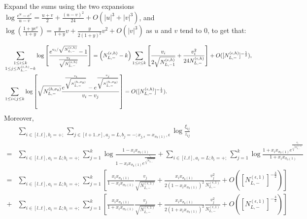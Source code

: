 \documentclass[11pt]{amsart}
\theoremstyle{plain}
\theoremstyle{definition}
\theoremstyle{remark}
\newcommand\si{\sigma}
\numberwithin{equation}{section}
\numberwithin{theorem}{section}
\numberwithin{figure}{section}
\begin{document}
Expand the sums using the  two expansions
$\log\frac{e^u-e^v}{u-v}=\frac{u+v}{2}+\frac{(u-v)^2}{24}+O(|u|^3+|v|^3)$, and
$\log(\frac{1+ye^v}{1+y})=\frac{y}{1+y}v+\frac{y}{2(1+y)^2}v^2+O(|v|^3)$ as $u$ and $v$
tend to 0, to get that:
\begin{small}
\begin{align*}
&\sum_{\substack{{1\leq i\leq k}\\{1\leq j\leq N_{L,-}^{(\epsilon,h)}-k}}}
\log\left[
  \frac{%
    e^{v_i/\sqrt{N_{L,-}^{(\epsilon,h)}}}-1
  }{%
    \frac{v_i}{\sqrt{N_{L,-}^{(\epsilon,h)}}}
  }
\right]=\left(N_{L,-}^{(\epsilon,h)}-k\right)\sum_{1\leq i\leq k}\left[\frac{v_i}{2\sqrt{N_{L,-1}^{(\epsilon,h)}}}+\frac{v_i^2}{24N_{L,-}^{(\epsilon,h)}}\right]+O([N_{L,-}^{(\epsilon,h
)}]^{-\frac{1}{2}}),\\
&\sum_{1\leq i<j\leq k}
\log\left[
  \sqrt{N_{L,-}^{(h,\si_0)}}\frac{e^{\frac{v_i}{\sqrt{N_{L,-}^{(h,\si_0)}}}}-e^{\frac{v_j}{\sqrt{N_{L,-}^{(h,\si_0)}}}}}{v_i-v_j}
\right]=O([N_{L,-}^{(\epsilon,h
)}]^{-\frac{1}{2}}).
\end{align*}
Moreover,
\begin{align*}
&\sum_{i\in[l..t],b_i=+;}\sum_{j\in[t+1..r],a_j=L,b_j=-;x_{j,\epsilon}=x_{\si_0(1)},\epsilon}\log\frac{\xi_{ij}}{z_{ij}}\\
=&\sum_{i\in[l..t],a_i=L;b_i=+;}\sum_{j=1}^k\log\frac{1-x_ix_{\si_0(1)}}{1-x_ix_{\si_0(1)}e^{\frac{v_j}{\sqrt{N_{L,-}^{(\epsilon,1)}}}}}+\sum_{i\in[l..t],a_i=L;b_i=+;}\sum_{j=1}^{k}\log\frac{1+x_ix_{\si_0(1)}e^{\frac{v_j}{\sqrt{N_{L,-}^{(\epsilon,1)}}}}}{1+x_ix_{\si_0(1)}}\\
=&\sum_{i\in[l..t],a_i=L;b_i=+;}\sum_{j=1}^k
\left[\frac{x_ix_{\si_0(1)}}{1-x_ix_{\si_0(1)}}\frac{v_j}{\sqrt{N_{L,-}^{(\epsilon,1)}}}
+\frac{x_ix_{\si_0(1)}}{2(1-x_ix_{\si_0(1)})^2}\frac{v_j^2}{N_{L,-}^{(\epsilon,1)}}
+O([N_{L,-}^{(\epsilon,1)}]^{-\frac{3}{2}})\right]\\
+&\sum_{i\in[l..t],a_i=L;b_i=+;}\sum_{j=1}^k
\left[\frac{x_ix_{\si_0(1)}}{1+x_ix_{\si_0(1)}}\frac{v_j}{\sqrt{N_{L,-}^{(\epsilon,1)}}}
+\frac{x_ix_{\si_0(1)}}{2(1+x_ix_{\si_0(1)})^2}\frac{v_j^2}{N_{L,-}^{(\epsilon,1)}}
+O([N_{L,-}^{(\epsilon,1)}]^{-\frac{3}{2}})\right]
\end{align*}
\end{small}
\end{document}
